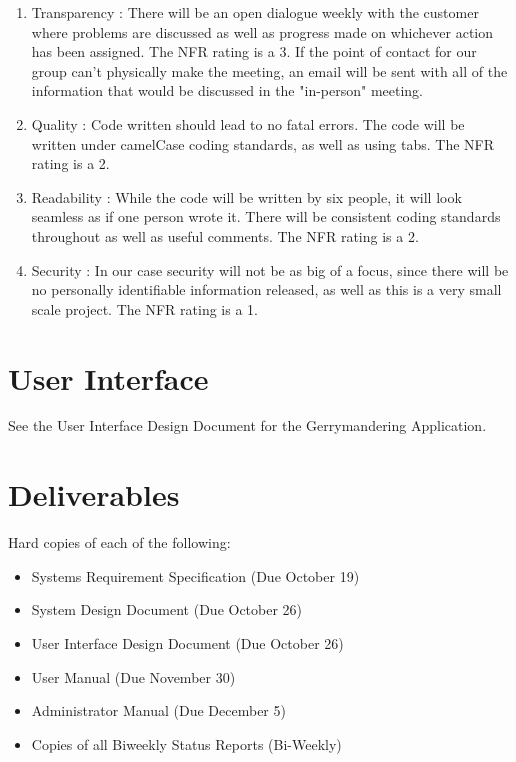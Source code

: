 \documentclass{article}
\begin{document}
\begin{addmargin}[2em]{0em}
\begin{enumerate}
\item Transparency : There will be an open dialogue weekly with the customer where problems are discussed as well as progress made on whichever action has been assigned. The NFR rating is a 3. If the point of contact for our group can't physically make the meeting, an email will be sent with all of the information that would be discussed in the "in-person" meeting.

\item Quality : Code written should lead to no fatal errors. The code will be written under camelCase coding standards, as well as using tabs. The NFR rating is a 2.

\item Readability : While the code will be written by six people, it will look seamless as if one person wrote it. There will be consistent coding standards throughout as well as useful comments. The NFR rating is a 2.

\item Security : In our case security will not be as big of a focus, since there will be no personally identifiable information released, as well as this is a very small scale project. The NFR rating is a 1.

\end{enumerate}
\end{addmargin}


\section{User Interface}\label{sec:ui}
\vspace{2.5mm}

See the User Interface Design Document for the Gerrymandering Application.

\vspace{2.5mm}
\section{Deliverables}\label{sec:deliverables}

Hard copies of each of the following:

\vspace{2.5mm}

\begin{adjustwidth}{2em}{0pt}
\begin{itemize}

\item Systems Requirement Specification (Due October 19)
\item System Design Document (Due October 26)
\item User Interface Design Document (Due October 26)
\item User Manual (Due November 30)
\item Administrator Manual (Due December 5)
\item Copies of all Biweekly Status Reports (Bi-Weekly)

\end{itemize}
\end{adjustwidth}
\end{document}
